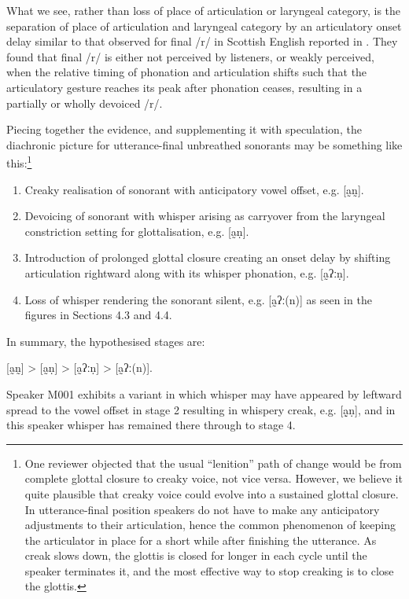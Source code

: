\documentclass[output=paper]{langscibook}
\begin{document}
What we see, rather than loss of place of articulation or laryngeal category, is the separation of place of articulation and laryngeal category by an articulatory onset delay similar to that observed for final \mbox{/r/} in Scottish English reported in \citet{LawsonEtAl2015}. They found that final \mbox{/r/} is either not perceived by listeners, or weakly perceived, when the relative timing of phonation and articulation shifts such that the articulatory gesture reaches its peak after phonation ceases, resulting in a partially or wholly devoiced \mbox{/r/}.

Piecing together the evidence, and supplementing it with speculation, the diachronic picture for utterance-final unbreathed sonorants may be something like this:\footnote{One reviewer objected that the usual “lenition” path of change would be from complete glottal closure to creaky voice, not vice versa. However, we believe it quite plausible that creaky voice could evolve into a sustained glottal closure. In utterance-final position speakers do not have to make any anticipatory adjustments to their articulation, hence the common phenomenon of keeping the articulator in place for a short while after finishing the utterance. As creak slows down, the glottis is closed for longer in each cycle until the speaker terminates it, and the most effective way to stop creaking is to close the glottis.}

\begin{enumerate}
\item Creaky realisation of sonorant with anticipatory vowel offset, e.g. [a̰n̰].
\item Devoicing of sonorant with whisper arising as carryover from the laryngeal constriction setting for glottalisation, e.g. [a̰ṇ].
\item Introduction of prolonged glottal closure creating an onset delay by shifting articulation rightward along with its whisper phonation, e.g. [a̰ʔːṇ].
\item Loss of whisper rendering the sonorant silent, e.g. [a̰ʔː(n)] as seen in the figures in Sections 4.3 and 4.4.
\end{enumerate}
In summary, the hypothesised stages are:

\ea{}
    [a̰n̰] > [a̰ṇ] > [a̰ʔːṇ] > [a̰ʔː(n)].
\z

Speaker M001 exhibits a variant in which whisper may have appeared by leftward spread to the vowel offset in stage 2 resulting in whispery creak, e.g. [a̰̣ṇ], and in this speaker whisper has remained there through to stage 4.
\end{document}
